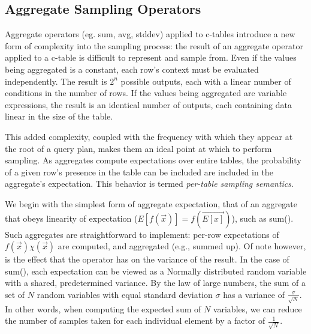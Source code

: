 %


\subsection{Aggregate Sampling Operators}
Aggregate operators (eg. sum, avg, stddev) applied to c-tables introduce a new form of complexity into the sampling process: the result of an aggregate operator applied to a c-table is difficult to represent and sample from.  Even if the values being aggregated is a constant, each row's context must be evaluated independently.  The result is $2^n$ possible outputs, each with a linear number of conditions in the number of rows.  If the values being aggregated are variable expressions, the result is an identical number of outputs, each containing data linear in the size of the table.  

This added complexity, coupled with the frequency with which they appear at the root of a query plan, makes them an ideal point at which to perform sampling.  As aggregates compute expectations over entire tables, the probability of a given row's presence in the table can be included are included in the aggregate's expectation.  This behavior is termed \textit{per-table sampling semantics}.

We begin with the simplest form of aggregate expectation, that of an aggregate that obeys linearity of expectation ($E[f(\vec{x})] = f(\vec{E[x]})$), such as sum().  Such aggregates are straightforward to implement: per-row expectations of $f(\vec x)\chi(\vec x)$ are computed, and aggregated (e.g., summed up).  Of note however, is the effect that the operator has on the variance of the result.  In the case of sum(), each expectation can be viewed as a Normally distributed random variable with a shared, predetermined variance.  By the law of large numbers, the sum of a set of $N$ random variables with equal standard deviation $\sigma$ has a variance of $\frac{\sigma}{\sqrt{N}}$.  In other words, when computing the expected sum of $N$ variables, we can reduce the number of samples taken for each individual element by a factor of $\frac{1}{\sqrt{N}}$.

